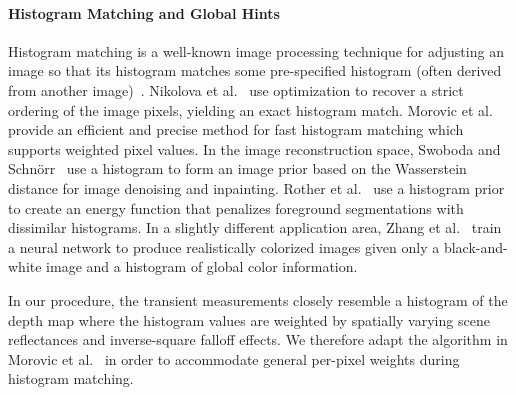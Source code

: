 \paragraph{Histogram Matching and Global Hints}
%
Histogram matching is a well-known image processing technique for adjusting an
image so that its histogram matches some pre-specified histogram (often derived
from another image)~\cite{gonzales1977gray,Gonzalez2008}. Nikolova et
al.~\cite{Nikolova2013} use optimization to recover a strict ordering of the
image pixels, yielding an exact histogram match. Morovic et
al.~\cite{Morovic2002} provide an efficient and precise method for fast
histogram matching which supports weighted pixel values. In the image
reconstruction space, Swoboda and Schn\"orr~\cite{Swoboda2013} use a histogram
to form an image prior based on the Wasserstein distance for image denoising and
inpainting. Rother et al.~\cite{Rother2006} use a histogram prior to create an
energy function that penalizes foreground segmentations with dissimilar
histograms.  In a slightly different application area, Zhang et
al.~\cite{Zhang2017} train a neural network to produce realistically colorized
images given only a black-and-white image and a histogram of global color
information.


In our procedure, the transient measurements closely resemble a histogram of
the depth map where the histogram values are weighted by spatially varying scene
reflectances and inverse-square falloff effects. We therefore adapt the
algorithm in Morovic et al.~\cite{Morovic2002} in order to accommodate general
per-pixel weights during histogram matching.


%



